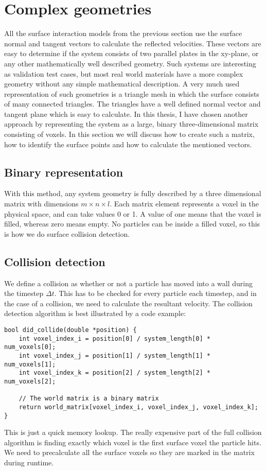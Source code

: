 \section{Complex geometries}
All the surface interaction models from the previous section use the surface normal and tangent vectors to calculate the reflected velocities. These vectors are easy to determine if the system consists of two parallel plates in the xy-plane, or any other mathematically well described geometry. Such systems are interesting as validation test cases, but most real world materials have a more complex geometry without any simple mathematical description. A very much used representation of such geometries is a triangle mesh in which the surface consists of many connected triangles. The triangles have a well defined normal vector and tangent plane which is easy to calculate. In this thesis, I have chosen another approach by representing the system as a large, binary three-dimensional matrix consisting of voxels. In this section we will discuss how to create such a matrix, how to identify the surface points and how to calculate the mentioned vectors.

\subsection{Binary representation}
\label{sec:dsmc_binary_representation}
With this method, any system geometry is fully described by a three dimensional matrix with dimensions $m\times n\times l$. Each matrix element represents a voxel in the physical space, and can take values 0 or 1. A value of one means that the voxel is filled, whereas zero means empty. No particles can be inside a filled voxel, so this is how we do surface collision detection. 
\subsection{Collision detection}
We define a collision as whether or not a particle has moved into a wall during the timestep $\Delta t$. This has to be checked for every particle each timestep, and in the case of a collision, we need to calculate the resultant velocity. The collision detection algorithm is best illustrated by a code example:
\begin{lstlisting}
bool did_collide(double *position) {
	int voxel_index_i = position[0] / system_length[0] * num_voxels[0];
	int voxel_index_j = position[1] / system_length[1] * num_voxels[1];
	int voxel_index_k = position[2] / system_length[2] * num_voxels[2];

	// The world matrix is a binary matrix
	return world_matrix[voxel_index_i, voxel_index_j, voxel_index_k];
}
\end{lstlisting}
This is just a quick memory lookup. The really expensive part of the full collision algorithm is finding exactly which voxel is the first surface voxel the particle hits. We need to precalculate all the surface voxels so they are marked in the matrix during runtime.
